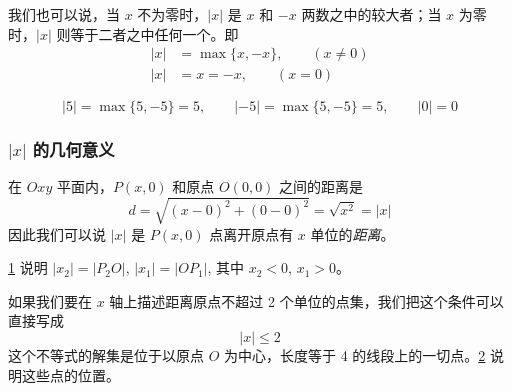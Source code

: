 我们也可以说，当 $x$ 不为零时，$|x|$ 是 $x$ 和 $-x$ 两数之中的较大者；当 $x$ 为零时，$|x|$ 则等于二者之中任何一个。即
\begin{equation}
  \begin{split}
    |x|&=\max\{x,-x\},\qquad (x\ne 0)\\
    |x|&=x=-x,\qquad (x=0)
  \end{split}
\end{equation}

\begin{example}
\[|5|=\max\{5,-5\}=5,\qquad |-5|=\max\{5,-5\}=5,\qquad |0|=0\]
\end{example}

\subsubsection{$|x|$ 的几何意义}
在 $Oxy$ 平面内，$P(x,0)$ 和原点 $O(0,0)$ 之间的距离是
\[d=\sqrt{(x-0)^2+(0-0)^2}=\sqrt{x^2}=|x|\]
因此我们可以说 $|x|$ 是 $P(x,0)$ 点离开原点有 $x$ 单位的\emph{距离}。

\cref{fig:distance} 说明 $|x_2|=|P_2O|$, $|x_1|=|OP_1|$, 其中 $x_2<0$,
$x_1>0$。
\begin{figure}
    \caption{}\label{fig:distance}
\end{figure}

如果我们要在 $x$ 轴上描述距离原点不超过 2 个单位的点集，我们把这个条件可以直接写成
\begin{equation}
  \label{eq:abs_neq}
    |x|\leqslant 2
\end{equation}
这个不等式的解集是位于以原点 $O$ 为中心，长度等于 4 的线段上的一切点。\cref{fig:range} 说明这些点的位置。
\begin{figure}
    \caption{}\label{fig:range} 
\end{figure}

